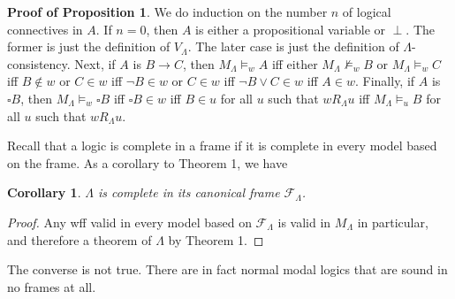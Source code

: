 \documentclass[12pt]{article}
\newtheorem{cor}{Corollary}
\begin{document}
\textbf{Proof of Proposition 1}.  We do induction on the number $n$ of logical connectives in $A$.  If $n=0$, then $A$ is either a propositional variable or $\perp$.  The former is just the definition of $V_{\Lambda}$.  The later case is just the definition of $\Lambda$-consistency.  Next, if $A$ is $B\to C$, then $M_{\Lambda} \models_w A$ iff either $M_{\Lambda} \not \models_w B$ or $M_{\Lambda} \models_w C$ iff $B \notin w$ or $C \in w$ iff $\neg B \in w$ or $C \in w$ iff $\neg B \lor C \in w$ iff $A \in w$.  Finally, if $A$ is $\square B$, then $M_{\Lambda} \models_w \square B$ iff $\square B \in w$ iff $B\in u$ for all $u$ such that $w R_{\Lambda} u$ iff $M_{\Lambda} \models_u B$ for all $u$ such that $w R_{\Lambda} u$.

Recall that a logic is complete in a frame if it is complete in every model based on the frame.  As a corollary to Theorem 1, we have
\begin{cor} $\Lambda$ is complete in its canonical frame $\mathcal{F}_{\Lambda}$.  \end{cor}
\begin{proof} Any wff valid in every model based on $\mathcal{F}_{\Lambda}$ is valid in $M_{\Lambda}$ in particular, and therefore a theorem of $\Lambda$ by Theorem 1. \end{proof}

The converse is not true.  There are in fact normal modal logics that are sound in no frames at all.
\end{document}
